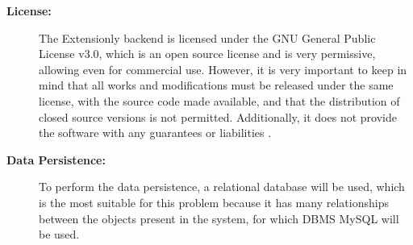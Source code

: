 \begin{description}
    \item[\textbf{License:}] The Extensionly backend is licensed under the GNU General Public License v3.0, which is an open source license and is very permissive, allowing even for commercial use. However, it is very important to keep in mind that all works and modifications must be released under the same license, with the source code made available, and that the distribution of closed source versions is not permitted. Additionally, it does not provide the software with any guarantees or liabilities \cite{gnugpl3}.
    
    \item[\textbf{Data Persistence:}]\label{data-persistence} To perform the data persistence, a relational database will be used, which is the most suitable for this problem because it has many relationships between the objects present in the system, for which \ac{DBMS} \ac{MySQL} will be used.
    
    

\end{description}
